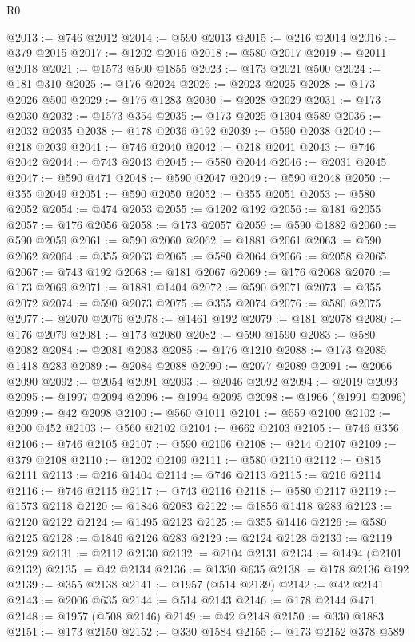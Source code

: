 \begin{lexlean}{R0}
\begin{coremodule}
@2013 := @746 @2012
@2014 := @590 @2013
@2015 := @216 @2014
@2016 := @379 @2015
@2017 := @1202 @2016
@2018 := @580 @2017
@2019 := @2011 @2018
@2021 := @1573 @500 @1855
@2023 := @173 @2021 @500
@2024 := @181 @310
@2025 := @176 @2024
@2026 := @2023 @2025
@2028 := @173 @2026 @500
@2029 := @176 @1283
@2030 := @2028 @2029
@2031 := @173 @2030
@2032 := @1573 @354
@2035 := @173 @2025 @1304 @589
@2036 := @2032 @2035
@2038 := @178 @2036 @192
@2039 := @590 @2038
@2040 := @218 @2039
@2041 := @746 @2040
@2042 := @218 @2041
@2043 := @746 @2042
@2044 := @743 @2043
@2045 := @580 @2044
@2046 := @2031 @2045
@2047 := @590 @471
@2048 := @590 @2047
@2049 := @590 @2048
@2050 := @355 @2049
@2051 := @590 @2050
@2052 := @355 @2051
@2053 := @580 @2052
@2054 := @474 @2053
@2055 := @1202 @192
@2056 := @181 @2055
@2057 := @176 @2056
@2058 := @173 @2057
@2059 := @590 @1882
@2060 := @590 @2059
@2061 := @590 @2060
@2062 := @1881 @2061
@2063 := @590 @2062
@2064 := @355 @2063
@2065 := @580 @2064
@2066 := @2058 @2065
@2067 := @743 @192
@2068 := @181 @2067
@2069 := @176 @2068
@2070 := @173 @2069
@2071 := @1881 @1404
@2072 := @590 @2071
@2073 := @355 @2072
@2074 := @590 @2073
@2075 := @355 @2074
@2076 := @580 @2075
@2077 := @2070 @2076
@2078 := @1461 @192
@2079 := @181 @2078
@2080 := @176 @2079
@2081 := @173 @2080
@2082 := @590 @1590
@2083 := @580 @2082
@2084 := @2081 @2083
@2085 := @176 @1210
@2088 := @173 @2085 @1418 @283
@2089 := @2084 @2088
@2090 := @2077 @2089
@2091 := @2066 @2090
@2092 := @2054 @2091
@2093 := @2046 @2092
@2094 := @2019 @2093
@2095 := @1997 @2094
@2096 := @1994 @2095
@2098 := @1966 (@1991 @2096)
@2099 := @42 @2098
@2100 := @560 @1011
@2101 := @559 @2100
@2102 := @200 @452
@2103 := @560 @2102
@2104 := @662 @2103
@2105 := @746 @356
@2106 := @746 @2105
@2107 := @590 @2106
@2108 := @214 @2107
@2109 := @379 @2108
@2110 := @1202 @2109
@2111 := @580 @2110
@2112 := @815 @2111
@2113 := @216 @1404
@2114 := @746 @2113
@2115 := @216 @2114
@2116 := @746 @2115
@2117 := @743 @2116
@2118 := @580 @2117
@2119 := @1573 @2118
@2120 := @1846 @2083
@2122 := @1856 @1418 @283
@2123 := @2120 @2122
@2124 := @1495 @2123
@2125 := @355 @1416
@2126 := @580 @2125
@2128 := @1846 @2126 @283
@2129 := @2124 @2128
@2130 := @2119 @2129
@2131 := @2112 @2130
@2132 := @2104 @2131
@2134 := @1494 (@2101 @2132)
@2135 := @42 @2134
@2136 := @1330 @635
@2138 := @178 @2136 @192
@2139 := @355 @2138
@2141 := @1957 (@514 @2139)
@2142 := @42 @2141
@2143 := @2006 @635
@2144 := @514 @2143
@2146 := @178 @2144 @471
@2148 := @1957 (@508 @2146)
@2149 := @42 @2148
@2150 := @330 @1883
@2151 := @173 @2150
@2152 := @330 @1584
@2155 := @173 @2152 @378 @589

\end{coremodule}
\end{lexlean}
